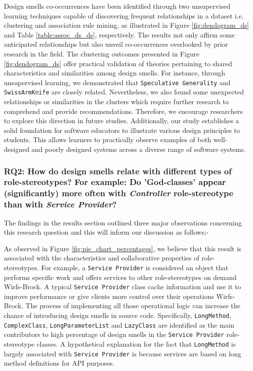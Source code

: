 \documentclass[AMA,Times1COL]{WileyNJDv5} %
\begin{document}
	Design smells co-occurrences have been identified through two unsupervised learning techniques capable of discovering frequent relationships in a dataset i.e. clustering and association rule mining, as illustrated in Figure \ref{fig:dendogram_ds} and Table \ref{table:assoc_ds_ds}, respectively. The results not only affirm some anticipated relationships but also unveil co-occurrences overlooked by prior research in the field. The clustering outcomes presented in Figure \ref{fig:dendogram_ds} offer practical validation of theories pertaining to shared characteristics and similarities among design smells. For instance, through unsupervised learning, we demonstrated that {\tt Speculative Generality} and {\tt SwissArmKnife} are closely related. Nevertheless, we also found some unexpected relationships or similarities in the clusters which require further research to comprehend and provide recommendations. Therefore, we encourage researchers to explore this direction in future studies. Additionally, our study establishes a solid foundation for software educators to illustrate various design principles to students. This allows learners to practically observe examples of both well-designed and poorly designed systems across a diverse range of software systems.
	
	\subsubsection*{RQ2: How do design smells relate with different types of role-stereotypes? For example: Do ’God-classes’ appear (significantly) more often with \textit{Controller} role-stereotype than with \textit{Service Provider}?}
	The findings in the results section outlined three major observations concerning this research question and this will inform our discussion as follows;- 
	
	As observed in Figure \ref{fig:pie_chart_percentages}, we believe that this result is associated with the characteristics and collaborative properties of role-stereotypes. For example, a {\tt Service Provider} is considered an object that performs specific work and offers services to other role-stereotypes on demand Wirfs-Brock\cite{wirfs2006characterizing}. A typical {\tt Service Provider} class cache information and use it to improve performance or give clients more control over their operations Wirfs-Brock\cite{wirfs2006characterizing}. The process of implementing all those operational logic can increase the chance of introducing design smells in source code. Specifically, {\tt LongMethod}, {\tt ComplexClass}, {\tt LongParameterList} and {\tt LazyClass} are identified as the main contributors to high percentage of design smells in the {\tt Service Provider} role-stereotype classes. A hypothetical explanation for the fact that {\tt LongMethod} is largely associated with {\tt Service Provider} is because services are based on long method definitions for API purposes.
	
\end{document}
